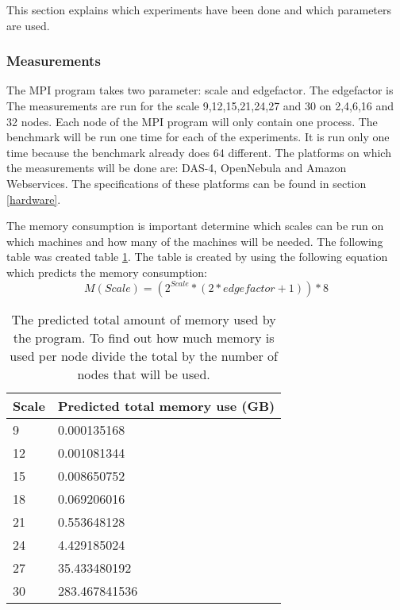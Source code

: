 This section explains which experiments have been done and which parameters are used.

\subsubsection{Measurements}
The MPI program takes two parameter: scale and edgefactor. The edgefactor is The measurements are run for the scale 9,12,15,21,24,27 and 30 on 2,4,6,16 and 32 nodes. Each node of the MPI program will only contain one process. The benchmark will be run one time for each of the experiments. It is run only one time because the benchmark already does 64 different. The platforms on which the measurements will be done are: DAS-4, OpenNebula and Amazon Webservices. The specifications of these platforms can be found in section \ref{hardware}.

The memory consumption is important determine which scales can be run on which machines and how many of the machines will be needed. The following table was created table \ref{tab:calculation memory consumption}. The table is created by using the following equation which predicts the memory consumption:
\begin{equation}
M(Scale) = (2^{Scale} *(2*edgefactor + 1)) * 8
\end{equation}
\begin{table} [!h]
	\begin{center}
		\begin{tabular}{|l|l|}
			\hline
			Scale & Predicted total memory use (GB) \\ \hline
			9 &  0.000135168 \\ \hline
			12 & 0.001081344 \\ \hline
			15 & 0.008650752 \\ \hline
			18 & 0.069206016 \\ \hline
			21 & 0.553648128 \\ \hline
			24 & 4.429185024 \\ \hline
			27 & 35.433480192 \\ \hline
			30 & 283.467841536 \\ \hline
		\end{tabular}
	\end{center}
	
	\caption{The predicted total amount of memory used by the program. To find out how much memory is used per node divide the total by the number of nodes that will be used.}
	\label{tab:calculation memory consumption}
\end{table}

